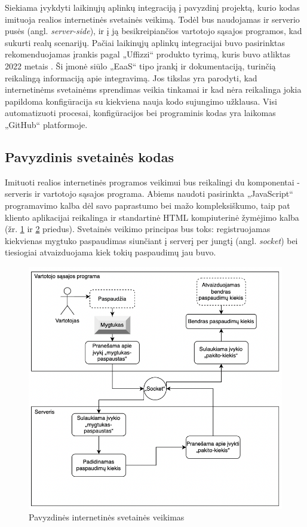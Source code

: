 \documentclass{VUMIFPSkursinis}
\begin{document}
Siekiama įvykdyti laikinųjų aplinkų integraciją į pavyzdinį projektą, kurio kodas imituoja realios internetinės svetainės veikimą. Todėl bus naudojamas ir serverio pusės (angl. \textit{server-side}), ir į ją besikreipiančios vartotojo sąsajos programos, kad sukurti realų scenarijų. Pačiai laikinųjų aplinkų integracijai buvo pasirinktas rekomenduojamas įrankis pagal „Uffizzi“ produkto tyrimą, kuris buvo atliktas 2022 metais \cite{SaltDvyliktas}. Ši įmonė siūlo „EaaS“ tipo įrankį ir dokumentaciją, turinčią reikalingą informaciją apie integravimą. Jos tikslas yra parodyti, kad internetinėms svetainėms sprendimas veikia tinkamai ir kad nėra reikalinga jokia papildoma konfigūracija su kiekviena nauja kodo sujungimo užklausa. Visi automatizuoti procesai, konfigūracijos bei programinis kodas yra laikomas „GitHub“ platformoje.

\subsection{Pavyzdinis svetainės kodas}

Imituoti realios internetinės programos veikimui bus reikalingi du komponentai - serveris ir vartotojo sąsajos programa. Abiems naudoti pasirinkta „JavaScript“ programavimo kalba dėl savo paprastumo bei mažo kompleksiškumo, taip pat kliento aplikacijai reikalinga ir standartinė HTML  kompiuterinė žymėjimo kalba (žr. \hyperref[priedas1]{1} ir \hyperref[priedas2]{2} priedus). Svetainės veikimo principas bus toks: registruojamas kiekvienas mygtuko paspaudimas siunčiant į serverį per jungtį (angl. \textit{socket}) bei tiesiogiai atvaizduojama kiek tokių paspaudimų jau buvo.

\begin{figure}[H]
    \centering
    \includegraphics[scale=0.8]{img/Aplikacija.png}
    \caption{Pavyzdinės internetinės svetainės veikimas}
    \label{img:mlp}
\end{figure}
\end{document}
